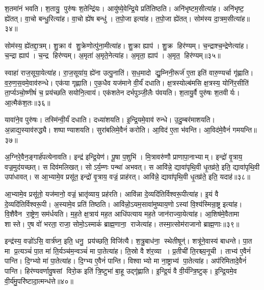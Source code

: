 श॒तमा॑नं भवति।
श॒तायु॒ पुरु॑षः श॒तेन्द्रि॑यः।
आयु॑ष्ये॒वेन्द्रि॒ये प्रति॑तिष्ठति।
अनि॑भृष्टम॒सीत्या॑ह।
अनि॑भृष्ट॒ ह्ये॑तत्।
वा॒चो बन्धु॒रित्या॑ह।
वा॒चो ह्ये॑ष बन्धु॑।
त॒पो॒जा इत्या॑ह।
त॒पो॒जा ह्ये॑तत्।
सोम॑स्य दा॒त्रम॒सीत्या॑ह॥३४॥

सोम॑स्य॒ ह्ये॑तद्दा॒त्रम्।
शु॒क्रा व॑ शु॒क्रेणोत्पु॑ना॒मीत्या॑ह।
शु॒क्रा ह्याप॑।
शु॒क्र हिर॑ण्यम्।
च॒न्द्राश्च॒न्द्रेणेत्या॑ह।
च॒न्द्रा ह्याप॑।
च॒न्द्र हिर॑ण्यम्।
अ॒मृता॑ अ॒मृते॒नेत्या॑ह।
अ॒मृता॒ ह्याप॑।
अ॒मृत॒ हिर॑ण्यम्॥३५॥

स्वाहा॑ राज॒सूया॒येत्या॑ह।
रा॒ज॒सूया॑य॒ ह्ये॑ना उत्पु॒नाति॑।
स॒ध॒मादो द्यु॒म्निनी॒रूर्ज॑ ए॒ता इति॑ वारु॒ण्यर्चा गृ॑ह्णाति।
व॒रु॒ण॒स॒वमे॒वाव॑रुन्धे।
एक॑या गृह्णाति।
ए॒क॒धैव यज॑माने वी॒र्यं॑ दधाति।
क्ष॒त्रस्योल्ब॑मसि क्ष॒त्रस्य॒ योनि॑र॒सीति॑ ता॒र्प्यञ्चो॒ष्णीषं॑ च॒ प्रय॑च्छति सयोनि॒त्वाय॑।
एक॑शतेन दर्भपुञ्जी॒लैः प॑वयति।
श॒तायु॒र्वै पुरु॑षः श॒तवीर्यः।
आ॒त्मैक॑श॒तः॥३६॥

यावा॑ने॒व पुरु॑षः।
तस्मि॑न्वी॒र्यं॑ दधाति।
दध्या॑शयति।
इ॒न्द्रि॒यमे॒वाव॑ रुन्धे।
उ॒दु॒म्बर॑माशयति।
अ॒न्नाद्य॒स्याव॑रुद्ध्यै।
शष्पाण्याशयति।
सुरा॑बलिमे॒वैनं॑ करोति।
आ॒विद॑ ए॒ता भ॑वन्ति।
आ॒विद॑मे॒वैनं॑ गमयन्ति॥३७॥

अ॒ग्निरे॒वैन॒ङ्गार्\mbox{}ह॑पत्येनावति।
इन्द्र॑ इन्द्रि॒येण॑।
पू॒षा प॒शुभि॑।
मि॒त्रावरु॑णौ प्राणापा॒नाभ्याम्।
इन्द्रो॑ वृ॒त्राय॒ वज्र॒मुद॑यच्छत्।
स दिव॑मलिखत्।
सोऽर्य॒म्णः पन्था॑ अभवत्।
स आवि॑न्ने॒ द्यावा॑पृथि॒वी धृ॒तव्र॑ते॒ इति॒ द्यावा॑पृथि॒वी उपा॑धावत्।
स आ॒भ्यामे॒व प्रसू॑त॒ इन्द्रो॑ वृ॒त्राय॒ वज्रं॒ प्राह॑रत्।
आवि॑न्ने॒ द्यावा॑पृथि॒वी धृ॒तव्र॑ते॒ इति॒ यदाह॑॥३८॥

आ॒भ्यामे॒व प्रसू॑तो॒ यज॑मानो॒ वज्रं॒ भ्रातृ॑व्याय॒ प्रह॑रति।
आवि॑न्ना दे॒व्यदि॑तिर्विश्वरू॒पीत्या॑ह।
इ॒यं वै दे॒व्यदि॑तिर्विश्व\-रू॒पी।
अ॒स्यामे॒व प्रति॑ तिष्ठति।
आवि॑न्नो॒ऽयम॒सावा॑मुष्या\-य॒णोऽस्यां वि॒श्य॑स्मिन्रा॒ष्ट्र इत्या॑ह।
वि॒शैवैन रा॒ष्ट्रेण॒ सम॑र्धयति।
म॒ह॒ते क्ष॒त्राय॑ मह॒त आधि॑पत्याय मह॒ते जान॑राज्या॒येत्या॑ह।
आ॒शिष॑मे॒वैतामा शास्ते।
ए॒ष वो॑ भरता॒ राजा॒ सोमो॒ऽस्माकं॑ ब्राह्म॒णाना॒ राजेत्या॑ह।
तस्मा॒त्सोम॑राजानो ब्राह्म॒णाः॥३९॥

इन्द्र॑स्य॒ वज्रो॑ऽसि॒ वार्त्र॑घ्न॒ इति॒ धनु॒ प्रय॑च्छति॒ विजि॑त्यै।
श॒त्रु॒बाध॑ना॒ स्थेतीषून्॑।
शत्रू॑ने॒वास्य॑ बाधन्ते।
पा॒त मा प्र॒त्यञ्चं॑ पा॒त मा॑ ति॒र्यञ्च॑म॒न्वञ्चं॑ मा पा॒तेत्या॑ह।
ति॒स्रो वै श॑र॒व्या।
प्र॒तीची॑ ति॒रश्च्य॒नूची।
ताभ्य॑ ए॒वैनं॑ पान्ति।
दि॒ग्भ्यो मा॑ पा॒तेत्या॑ह।
दि॒ग्भ्य ए॒वैनं॑ पान्ति।
विश्वाभ्यो मा ना॒ष्ट्राभ्य॑ पा॒तेत्या॑ह।
अप॑रिमितादे॒वैनं॑ पान्ति।
हिर॑ण्यवर्णावु॒षसां विरो॒क इति॑ त्रि॒ष्टुभा॑ बा॒हू उद्गृ॑ह्णाति।
इ॒न्द्रि॒यं वै वी॒र्य॑न्त्रि॒ष्टुक्।
इ॒न्द्रि॒यमे॒व वी॒र्य॑मु॒परि॑ष्टादा॒त्मन्ध॑त्ते॥४०॥\anuvakamend[व्यावृ॑त्त्यै दा॒त्रम॒सीत्या॑हा॒मृत॒ हिर॑ण्यमेकश॒तो ग॑मय॒न्त्याह॑ ब्राह्म॒णा ना॒ष्ट्राभ्य॑ पा॒तेत्या॑ह च॒त्वारि॑ च]

